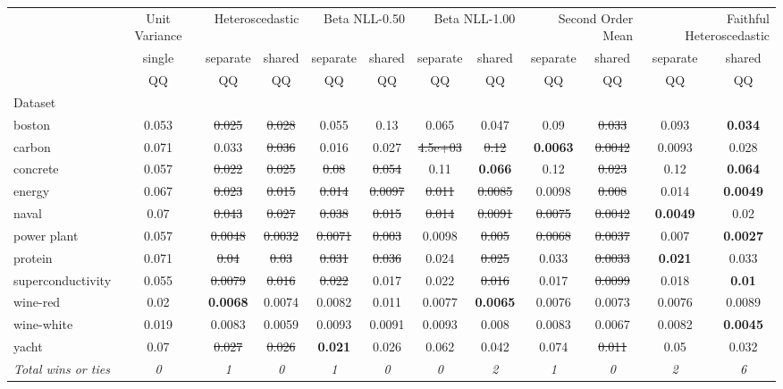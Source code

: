 \begin{tabular}{l|c|cc|cc|cc|cc|cc}
\toprule
{} & {Unit Variance} & \multicolumn{2}{r}{Heteroscedastic} & \multicolumn{2}{r}{Beta NLL-0.50} & \multicolumn{2}{r}{Beta NLL-1.00} & \multicolumn{2}{r}{Second Order Mean} & \multicolumn{2}{r}{Faithful Heteroscedastic} \\
{} & {single} & {separate} & {shared} & {separate} & {shared} & {separate} & {shared} & {separate} & {shared} & {separate} & {shared} \\
{} & {QQ} & {QQ} & {QQ} & {QQ} & {QQ} & {QQ} & {QQ} & {QQ} & {QQ} & {QQ} & {QQ} \\
{Dataset} & {} & {} & {} & {} & {} & {} & {} & {} & {} & {} & {} \\
\midrule
boston & 0.053 & \sout{0.025} & \sout{0.028} & 0.055 & 0.13 & 0.065 & 0.047 & 0.09 & \sout{0.033} & 0.093 & \textbf{0.034} \\
carbon & 0.071 & 0.033 & \sout{0.036} & 0.016 & 0.027 & \sout{4.5e+03} & \sout{0.12} & \textbf{0.0063} & \sout{0.0042} & 0.0093 & 0.028 \\
concrete & 0.057 & \sout{0.022} & \sout{0.025} & \sout{0.08} & \sout{0.054} & 0.11 & \textbf{0.066} & 0.12 & \sout{0.023} & 0.12 & \textbf{0.064} \\
energy & 0.067 & \sout{0.023} & \sout{0.015} & \sout{0.014} & \sout{0.0097} & \sout{0.011} & \sout{0.0085} & 0.0098 & \sout{0.008} & 0.014 & \textbf{0.0049} \\
naval & 0.07 & \sout{0.043} & \sout{0.027} & \sout{0.038} & \sout{0.015} & \sout{0.014} & \sout{0.0091} & \sout{0.0075} & \sout{0.0042} & \textbf{0.0049} & 0.02 \\
power plant & 0.057 & \sout{0.0048} & \sout{0.0032} & \sout{0.0071} & \sout{0.003} & 0.0098 & \sout{0.005} & \sout{0.0068} & \sout{0.0037} & 0.007 & \textbf{0.0027} \\
protein & 0.071 & \sout{0.04} & \sout{0.03} & \sout{0.031} & \sout{0.036} & 0.024 & \sout{0.025} & 0.033 & \sout{0.0033} & \textbf{0.021} & 0.033 \\
superconductivity & 0.055 & \sout{0.0079} & \sout{0.016} & \sout{0.022} & 0.017 & 0.022 & \sout{0.016} & 0.017 & \sout{0.0099} & 0.018 & \textbf{0.01} \\
wine-red & 0.02 & \textbf{0.0068} & 0.0074 & 0.0082 & 0.011 & 0.0077 & \textbf{0.0065} & 0.0076 & 0.0073 & 0.0076 & 0.0089 \\
wine-white & 0.019 & 0.0083 & 0.0059 & 0.0093 & 0.0091 & 0.0093 & 0.008 & 0.0083 & 0.0067 & 0.0082 & \textbf{0.0045} \\
yacht & 0.07 & \sout{0.027} & \sout{0.026} & \textbf{0.021} & 0.026 & 0.062 & 0.042 & 0.074 & \sout{0.011} & 0.05 & 0.032 \\
\textit{{Total wins or ties}} & \textit{0} & \textit{1} & \textit{0} & \textit{1} & \textit{0} & \textit{0} & \textit{2} & \textit{1} & \textit{0} & \textit{2} & \textit{6} \\
\bottomrule
\end{tabular}
